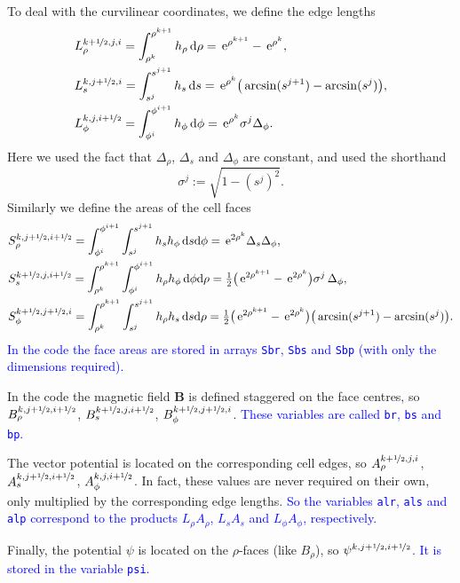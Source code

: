 \documentclass[11pt]{article}
\newcommand{\dr}{\Delta_\rho}
\newcommand{\ds}{\Delta_s}
\newcommand{\dph}{\Delta_\phi}
\newcommand{\half}{\nicefrac{1}{2}}
\newcommand{\Bb}{\boldsymbol{B}}
\newcommand{\ex}{\,\mathrm{e}}
\begin{document}
To deal with the curvilinear coordinates, we define the edge lengths
\begin{align*}
&L_\rho^{k+\half,j,i} = \int_{\rho^k}^{\rho^{k+1}} h_\rho\,\mathrm{d}\rho = \ex^{\rho^{k+1}} - \ex^{\rho^k},\\
&L_s^{k,j+\half,i} = \int_{s^j}^{s^{j+1}} h_s\,\mathrm{d}s = \ex^{\rho^k}\big(\arcsin(s^{j+1}) - \arcsin(s^j)\big),\\
&L_\phi^{k,j,i+\half} = \int_{\phi^i}^{\phi^{i+1}} h_\phi\,\mathrm{d}\phi = \ex^{\rho^k}\sigma^j\dph.
\end{align*}
Here we used the fact that $\dr$, $\ds$ and $\dph$ are constant, and used the shorthand
\[
\sigma^j := \sqrt{1 - (s^j)^2}.
\]
Similarly we define the areas of the cell faces
\begin{align*}
&S_\rho^{k,j+\half,i+\half} =  \int_{\phi^i}^{\phi^{i+1}}\int_{s^j}^{s^{j+1}} h_s h_\phi\,\mathrm{d}s\mathrm{d}\phi = \ex^{2\rho^k}\ds\dph,\\
&S_s^{k+\half,j,i+\half} = \int_{\rho^k}^{\rho^{k+1}}\int_{\phi^i}^{\phi^{i+1}} h_\rho h_\phi\,\mathrm{d}\phi\mathrm{d}\rho = \tfrac12\big(\ex^{2\rho^{k+1}} - \ex^{2\rho^{k}}\big)\sigma^j\,\dph,\\
&S_\phi^{k+\half,j+\half,i} = \int_{\rho^k}^{\rho^{k+1}}\int_{s^j}^{s^{j+1}}h_\rho h_s\,\mathrm{d}s\mathrm{d}\rho = \tfrac12\big(\ex^{2\rho^{k+1}}- \ex^{2\rho^k}\big)\big(\arcsin(s^{j+1}) - \arcsin(s^j)\big).
\end{align*}
\textcolor{blue}{In the code the face areas are stored in arrays \texttt{Sbr}, \texttt{Sbs} and \texttt{Sbp} (with only the dimensions required).}

In the code the magnetic field $\Bb$ is defined staggered on the face centres, so $B_\rho^{k,j+\half,i+\half}$, $B_s^{k+\half,j,i+\half}$, $B_\phi^{k+\half,j+\half,i}$. \textcolor{blue}{These variables are called \texttt{br}, \texttt{bs} and \texttt{bp}.}

The vector potential is located on the corresponding cell edges, so $A_\rho^{k+\half,j,i}$, $A_s^{k,j+\half,i+\half}$, $A_\phi^{k,j,i+\half}$. In fact, these values are never required on their own, only multiplied by the corresponding edge lengths. \textcolor{blue}{So the variables \texttt{alr}, \texttt{als} and \texttt{alp} correspond to the products $L_\rho A_\rho$, $L_sA_s$ and $L_\phi A_\phi$, respectively.}

Finally, the potential $\psi$ is located on the $\rho$-faces (like $B_\rho$), so $\psi^{k,j+\half,i+\half}$. \textcolor{blue}{It is stored in the variable \texttt{psi}.}
\end{document}
